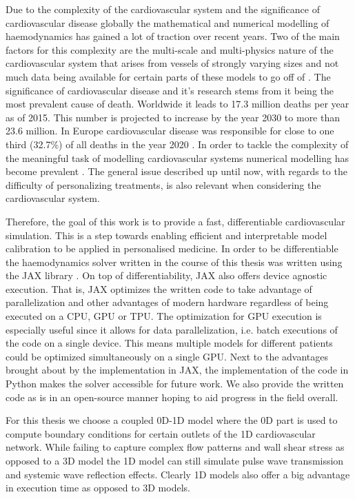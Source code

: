 \documentclass[a4paper, oneside]{discothesis}
\begin{document}
Due to the complexity of the cardiovascular system and the significance of cardiovascular disease globally the mathematical and numerical modelling of haemodynamics has gained a lot of traction over recent years.
Two of the main factors for this complexity are the multi-scale and multi-physics nature of the cardiovascular system that arises from vessels of strongly varying sizes and not much data being available for certain parts of these models to go off of \cite{quarteroni2016geometric}.
The significance of cardiovascular disease and it's research stems from it being the most prevalent cause of death.
Worldwide it leads to 17.3 million deaths per year as of 2015.
This number is projected to increase by the year 2030 to more than 23.6 million. \cite{update2015heart}
In Europe cardiovascular disease was responsible for close to one third (32.7\%) of all deaths in the year 2020 \cite{Coelho2020}.
In order to tackle the complexity of the meaningful task of modelling cardiovascular systems numerical modelling has become prevalent \cite{formaggia2009multiscale,quarteroni2016geometric,black2020p14,el2018investigating,qureshi2014numerical,reichold2009vascular}.
The general issue described up until now, with regards to the difficulty of personalizing treatments, is also relevant when considering the cardiovascular system.

Therefore, the goal of this work is to provide a fast, differentiable cardiovascular simulation.
This is a step towards enabling efficient and interpretable model calibration to be applied in personalised medicine.
In order to be differentiable the haemodynamics solver written in the course of this thesis was written using the JAX library \cite{jax}.
On top of differentiability, JAX also offers device agnostic execution.
That is, JAX optimizes the written code to take advantage of parallelization and other advantages of modern hardware regardless of being executed on a CPU, GPU or TPU.
The optimization for GPU execution is especially useful since it allows for data parallelization, i.e. batch executions of the code on a single device.
This means multiple models for different patients could be optimized simultaneously on a single GPU.
Next to the advantages brought about by the implementation in JAX, the implementation of the code in Python makes the solver accessible for future work.
We also provide the written code as is in an open-source manner hoping to aid progress in the field overall.

For this thesis we choose a coupled 0D-1D model where the 0D part is used to compute boundary conditions for certain outlets of the 1D cardiovascular network.
While failing to capture complex flow patterns and wall shear stress as opposed to a 3D model the 1D model can still simulate pulse wave transmission and systemic wave reflection effects.
Clearly 1D models also offer a big advantage in execution time as opposed to 3D models. \cite{shi2011review,pfaller2020using,arzani2022machine} 
\end{document}
